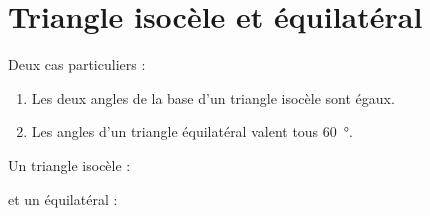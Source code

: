 \section{Triangle isocèle et équilatéral}

\begin{propriete}
    Deux cas particuliers :
    \begin{enumerate}
        \item
            Les deux angles de la base d'un triangle isocèle sont égaux.
        \item
            Les angles d'un triangle équilatéral valent tous \SI{60}{\degree}.
    \end{enumerate}
\end{propriete}

\begin{example}
    
    Un triangle isocèle :
    \begin{center}
        
    \end{center}
     et un équilatéral :
     \begin{center}
        
     \end{center}
\end{example}
